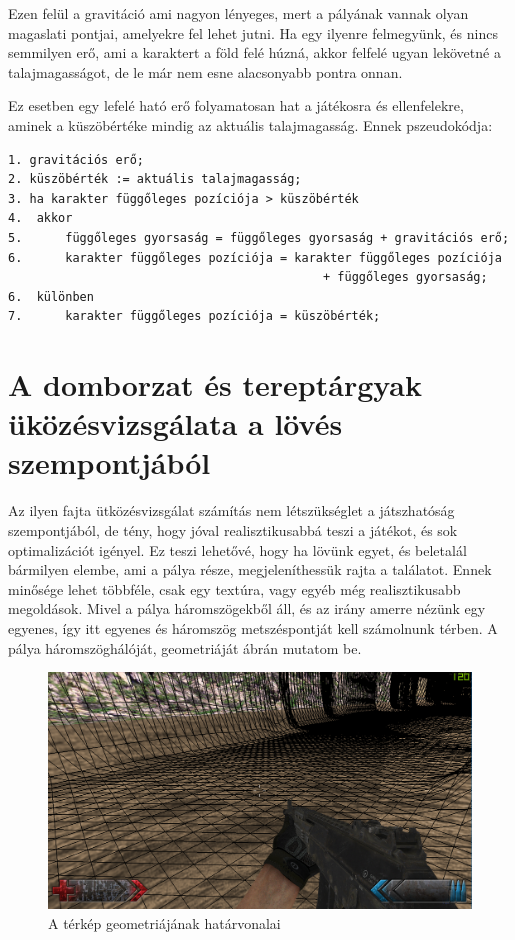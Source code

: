 Ezen felül a gravitáció ami nagyon lényeges, mert a pályának vannak olyan magaslati pontjai, amelyekre fel lehet jutni. Ha egy ilyenre felmegyünk, és nincs semmilyen erő, ami a karaktert a föld felé húzná, akkor felfelé ugyan lekövetné a talajmagasságot, de le már nem esne alacsonyabb pontra onnan.

 Ez esetben egy lefelé ható erő folyamatosan hat a játékosra és ellenfelekre, aminek a küszöbértéke mindig az aktuális talajmagasság. Ennek pszeudokódja:

\begin{verbatim}
1. gravitációs erő;
2. küszöbérték := aktuális talajmagasság;
3. ha karakter függőleges pozíciója > küszöbérték
4. 	akkor
5.		függőleges gyorsaság = függőleges gyorsaság + gravitációs erő;
6.		karakter függőleges pozíciója = karakter függőleges pozíciója 
											+ függőleges gyorsaság;
6.	különben
7. 		karakter függőleges pozíciója = küszöbérték;
\end{verbatim}
 
\section{A domborzat és tereptárgyak üközésvizsgálata a lövés szempontjából}

Az ilyen fajta ütközésvizsgálat számítás nem létszükséglet a játszhatóság szempontjából, de tény, hogy jóval realisztikusabbá teszi a játékot, és sok optimalizációt igényel. Ez teszi lehetővé, hogy ha lövünk egyet, és beletalál bármilyen elembe, ami a pálya része, megjeleníthessük rajta a találatot. Ennek minősége lehet többféle, csak egy textúra, vagy egyéb még realisztikusabb megoldások. Mivel a pálya háromszögekből áll, és az irány amerre nézünk egy egyenes, így itt egyenes és háromszög metszéspontját kell számolnunk térben. A pálya háromszöghálóját, geometriáját  ábrán mutatom be.

\begin{figure}[h]
\centering
\includegraphics[scale=0.4]{kepek/map_wireframe.png}
\caption{A térkép geometriájának határvonalai}
\label{fig:wireframe}
\end{figure}

